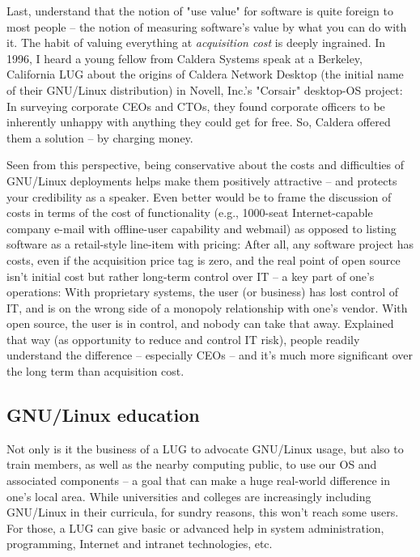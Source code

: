 Last, understand that the notion of "use value" for software is quite
foreign to most people -- the notion of measuring software's value by
what you can do with it.  The habit of valuing everything at
{\itshape acquisition cost\/} is deeply ingrained.  In 1996, I heard a young
fellow from Caldera Systems speak at a Berkeley, California LUG about
the origins of Caldera Network Desktop (the initial name of their GNU/Linux
distribution) in Novell, Inc.'s "Corsair" desktop-OS project:  In
surveying corporate CEOs and CTOs, they found corporate officers to be
inherently unhappy with anything they could get for free.  So, Caldera
offered them a solution -- by charging money.

Seen from this perspective, being conservative about the costs and
difficulties of GNU/Linux deployments helps make them positively attractive
-- and protects your credibility as a speaker.  Even better would be
to frame the discussion of costs in terms of the cost of functionality
(e.g., 1000-seat Internet-capable company e-mail with offline-user
capability and webmail) as opposed to listing software as a retail-style
line-item with pricing:  After all, any software project has costs,
even if the acquisition price tag is zero, and the real point of open
source isn't initial cost but rather long-term control over IT -- a key
part of one's operations:  With proprietary systems, the user (or
business) has lost control of IT, and is on the wrong side of a monopoly
relationship with one's vendor.  With open source, the user is in
control, and nobody can take that away.  Explained that way (as
opportunity to reduce and control IT risk), people readily understand
the difference -- especially CEOs -- and it's much more significant over
the long term than acquisition cost.




\subsection{GNU/Linux education}

Not only is it the business of a LUG to advocate GNU/Linux usage, but
also to train members, as well as the nearby computing public,
to use our OS and associated components -- a goal that can make a huge
real-world difference in one's local area.  While universities and
colleges are increasingly including GNU/Linux in their curricula, for
sundry reasons, this won't reach some users.  For those, a LUG can
give basic or advanced help in system administration, programming,
Internet and intranet technologies, etc.


